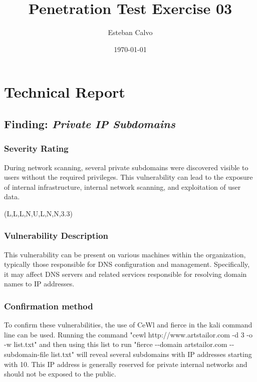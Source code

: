 \documentclass[notitlepage]{article}
\begin{document}
  
\title{Penetration Test Exercise 03}
\author{Esteban Calvo}
\date{\isodate\today}

\maketitle

\tableofcontents

\newpage

\section{Technical Report}

  \subsection{Finding: \emph{Private IP Subdomains}}
  
	\subsubsection*{Severity Rating}
	    During network scanning, several private subdomains were discovered visible to users without
            the required privileges. This vulnerability can lead to the exposure of internal infrastructure, internal network scanning, and exploitation of user data.
            
		\cvss(L,L,L,N,U,L,N,N,3.3)
		
  	\subsubsection*{Vulnerability Description}
            This vulnerability can be present on various machines within the organization, typically those responsible for DNS configuration and management. Specifically, it may affect DNS servers and related services responsible for resolving domain names to IP addresses.
  		
  	\subsubsection*{Confirmation method}
            To confirm these vulnerabilities, the use of CeWl and fierce in the kali command line can be used. Running the command "cewl http://www.artstailor.com -d 3 -o -w list.txt" and then using this list to run "fierce -{}-domain artstailor.com -{}-subdomain-file list.txt" will reveal several subdomains with IP addresses starting with 10. This IP address is generally reserved for private internal networks and should not be exposed to the  public.
		
\end{document}
